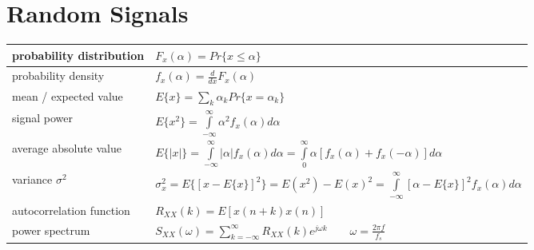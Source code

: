 \section{Random Signals}
\begin{tabularx}{\linewidth}{|l|X|}
	\hline
	probability distribution & $F_x(\alpha) = Pr\{x \leq \alpha \}$ \\
	\hline
	probability density & $f_x(\alpha) = \frac{d}{dx}F_x(\alpha)$\\
	\hline
	mean / expected value & $E\{x\} = \sum\limits_k \alpha_k Pr\{x = \alpha_k\}$ \\
	\hline
	signal power & $E\{ x^2 \} = \int\limits_{-\infty}^{\infty} \alpha^2 f_x(\alpha) d\alpha$ \\
	\hline
	average absolute value & $E\{ |x| \} = \int\limits_{-\infty}^{\infty} |\alpha| f_x(\alpha) d\alpha 
										 = \int\limits_{0}^{\infty} \alpha[f_x(\alpha) + f_x(-\alpha)] d\alpha $
	\\ \hline
	variance $\sigma^2$ & 
	$\sigma_x^2 = E\{ [x-E\{ x \}]^2 \} = E(x^2) - E(x)^2 = \int\limits_{-\infty}^{\infty}[\alpha - E\{ x \}]^2 f_x(\alpha) d\alpha $
	\\ \hline
	autocorrelation function & 
	$R_{XX}(k) = E[x(n+k)x(n)]$
	\\ \hline
	power spectrum & 
	$S_{XX}(\omega) = \sum\limits_{k=-\infty}^{\infty} R_{XX}(k)e^{j\omega k} \qquad \omega = \frac{2\pi f}{f_s} $
	\\ \hline
\end{tabularx}